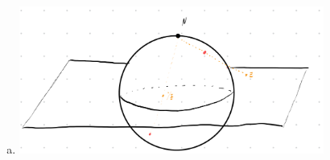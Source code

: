 \documentclass[10pt]{mypackage}
\begin{document}
\begin{solution}[18.18]
\begin{enumerate}[(a)]
\begin{center}
      \end{center}
    \item \hfill
      \begin{center}
        \includegraphics[width=10cm]{images/18_18_e.png}
      \end{center}
  \end{enumerate}
\end{solution}
\end{document}
